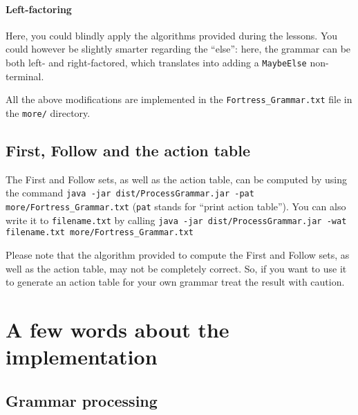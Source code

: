 \documentclass[a4paper]{scrartcl}
\begin{document}

\paragraph{Left-factoring}
Here, you could blindly apply the algorithms provided during the lessons. You could however be slightly smarter regarding the ``else'': here, the grammar can be both left- and right-factored, which translates into adding a \texttt{MaybeElse} non-terminal.

\medskip

All the above modifications are implemented in the \verb#Fortress_Grammar.txt# file in the \verb#more/# directory.

\subsection{First, Follow and the action table}

The First and Follow sets, as well as the action table, can be computed by using the command \verb#java -jar dist/ProcessGrammar.jar -pat more/Fortress_Grammar.txt# (\texttt{pat} stands for ``print action table''). You can also write it to \texttt{filename.txt} by calling \verb#java -jar dist/ProcessGrammar.jar -wat filename.txt more/Fortress_Grammar.txt#

Please note that the algorithm provided to compute the First and Follow sets, as well as the action table, may not be completely correct. So, if you want to use it to generate an action table for your own grammar treat the result with caution. 

\section{A few words about the implementation}

\subsection{Grammar processing}
\end{document}
